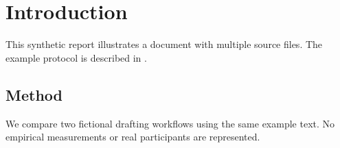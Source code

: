\chapter{Introduction}
This synthetic report illustrates a document with multiple source files.
The example protocol is described in \cite{protocol}.
\section{Method}
We compare two fictional drafting workflows using the same example text.
No empirical measurements or real participants are represented.
\label{sec:method}
